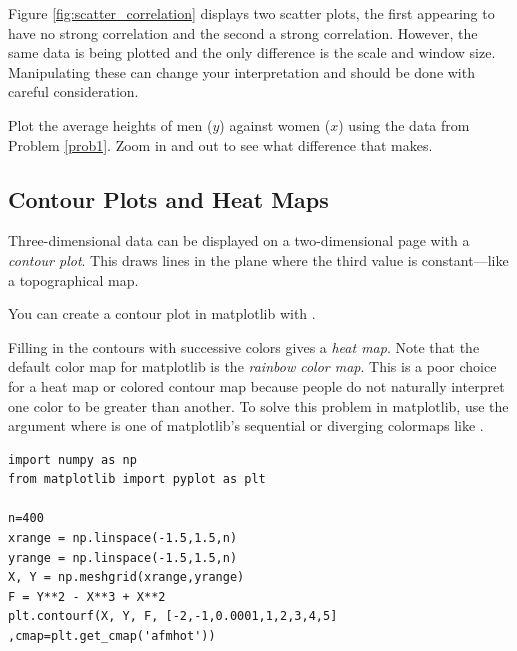 Figure \ref{fig:scatter_correlation} displays two scatter plots, the first appearing to have no strong correlation and the second a strong correlation. However, the same data is being plotted and the only difference is the scale and window size. Manipulating these can change your interpretation and should be done with careful consideration.

\begin{problem}
Plot the average heights of men ($y$) against women ($x$) using the data from Problem \ref{prob1}. Zoom in and out to see what difference that makes.
\end{problem}




\subsection*{Contour Plots and Heat Maps}

Three-dimensional data can be displayed on a two-dimensional page with a \emph{contour plot}.  This draws lines in the plane where the third value is constant---like a topographical map.  

You can create a contour plot in matplotlib with 
.

Filling in the contours with successive colors gives a  \emph{heat map}. Note that the default color map for matplotlib is the  \emph{rainbow color map}.  This is a poor choice for a heat map or colored contour map because people do not naturally interpret one color to be greater than another.  To solve this problem in matplotlib, use the argument 
where  is one of matplotlib's sequential or diverging colormaps like . 

\begin{lstlisting}
import numpy as np
from matplotlib import pyplot as plt

n=400
xrange = np.linspace(-1.5,1.5,n)
yrange = np.linspace(-1.5,1.5,n)
X, Y = np.meshgrid(xrange,yrange)
F = Y**2 - X**3 + X**2
plt.contourf(X, Y, F, [-2,-1,0.0001,1,2,3,4,5] ,cmap=plt.get_cmap('afmhot'))
\end{lstlisting}

